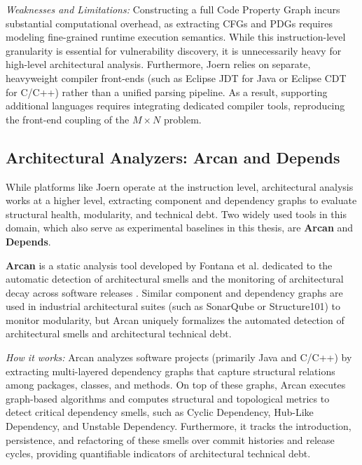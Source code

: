 \textit{Weaknesses and Limitations:} Constructing a full Code Property Graph
incurs substantial computational overhead, as extracting CFGs and PDGs requires
modeling fine-grained runtime execution semantics. While this instruction-level
granularity is essential for vulnerability discovery, it is unnecessarily
heavy for high-level architectural analysis. Furthermore, Joern relies on
separate, heavyweight compiler front-ends (such as Eclipse JDT for Java or
Eclipse CDT for C/C++) rather than a unified parsing pipeline. As a result,
supporting additional languages requires integrating dedicated compiler tools,
reproducing the front-end coupling of the $M \times N$ problem.

\subsection{Architectural Analyzers: Arcan and Depends}
\label{sec:architectural_dependency_analyzers}

While platforms like Joern operate at the instruction level, architectural
analysis works at a higher level, extracting component and dependency graphs to
evaluate structural health, modularity, and technical debt. Two widely used
tools in this domain, which also serve as experimental baselines in this
thesis, are \textbf{Arcan} and \textbf{Depends}.

\textbf{Arcan} \cite{fontana_arcan_2017} is a static analysis
tool developed by Fontana et al. dedicated to the automatic detection of
architectural smells and the monitoring of architectural decay across software
releases \cite{sas_investigating_2019}. Similar component and
dependency graphs are used in industrial architectural suites (such as
SonarQube or Structure101) to monitor modularity, but Arcan uniquely formalizes
the automated detection of architectural smells and architectural
technical debt.

\textit{How it works:} Arcan analyzes software projects (primarily Java and
C/C++) by extracting multi-layered dependency graphs that capture structural
relations among packages, classes, and methods. On top of these graphs, Arcan
executes graph-based algorithms and computes structural and topological metrics
to detect critical dependency smells, such as Cyclic Dependency, Hub-Like
Dependency, and Unstable Dependency. Furthermore, it tracks the introduction,
persistence, and refactoring of these smells over commit histories and release
cycles, providing quantifiable indicators of architectural technical debt.

